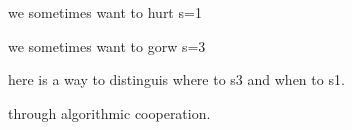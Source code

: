 

we sometimes want to hurt s=1

we sometimes want to gorw s=3

here is a way to distinguis where to s3 and when to s1. 

through algorithmic cooperation. 

